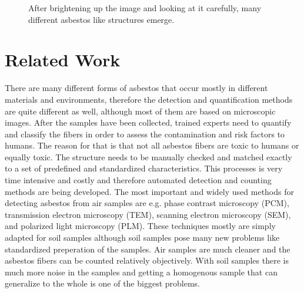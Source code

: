 \begin{figure}[h]
\centering


\caption{After brightening up the image and looking at it carefully, many different asbestos like structures emerge.}
\label{fig:non-asbestos_examples}
\end{figure}

\section{Related Work}

There are many different forms of asbestos that occur mostly in different materials and environments, therefore the detection and quantification methods are quite different as well, although most of them are based on microscopic images. After the samples have been collected, trained experts need to quantify and classify the fibers in order to assess the contamination and risk factors to humans. The reason for that is that not all asbestos fibers are toxic to humans or equally toxic. The structure needs to be manually checked and matched exactly to a set of predefined and standardized characteristics. This processes is very time intensive and costly and therefore automated detection and counting methods are being developed. The most important and widely used methods for detecting asbestos from air samples are e.g. phase contrast microscopy (PCM), transmission electron microscopy (TEM), scanning electron microscopy (SEM), and polarized light microscopy (PLM). These techniques mostly are simply adapted for soil samples although soil samples pose many new problems like standardized preperation of the samples. Air samples are much cleaner and the asbestos fibers can be counted relatively objectively. With soil samples there is much more noise in the samples and getting a homogenous sample that can generalize to the whole is one of the biggest problems. \\

